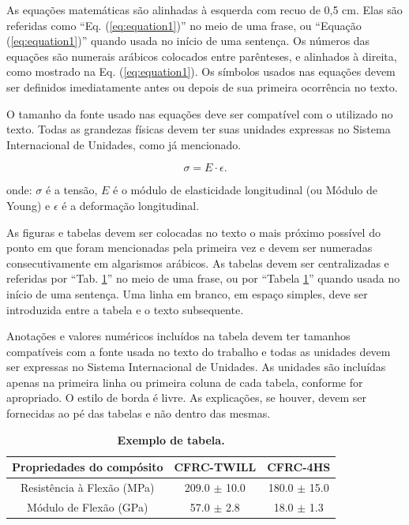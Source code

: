 \documentclass[10pt,fleqn,a4paper,twoside]{article}
\begin{document}
        As equações matemáticas são alinhadas à esquerda com recuo de 0,5 cm.  Elas são referidas como ``Eq. (\ref{eq:equation1})'' no meio de uma frase, ou ``Equação (\ref{eq:equation1})'' quando usada no início de uma sentença. Os números das equações são numerais arábicos colocados entre parênteses, e alinhados à direita, como mostrado na Eq. (\ref{eq:equation1}). Os símbolos usados nas equações devem ser definidos imediatamente antes ou depois de sua primeira ocorrência no texto.

        O tamanho da fonte usado nas equações deve ser compatível com o utilizado no texto. Todas as grandezas físicas devem ter suas unidades expressas no Sistema Internacional de Unidades, como já mencionado.

        \begin{equation}
        \sigma = E \cdot \epsilon. \label{eq:equation1}
        \end{equation}
    
    	\noindent
    	onde: $\sigma$ é a tensão, $E$ é o módulo de elasticidade longitudinal (ou Módulo de Young) e $\epsilon$ é a deformação longitudinal.

        As figuras e tabelas devem ser colocadas no texto o mais próximo possível do ponto em que foram mencionadas pela primeira vez e devem ser numeradas consecutivamente em algarismos arábicos. As tabelas devem ser centralizadas e referidas por ``Tab. \ref{tab:tabexemplo}'' no meio de uma frase, ou por ``Tabela \ref{tab:tabexemplo}'' quando usada no início de uma sentença. Uma linha em branco, em espaço simples, deve ser introduzida entre a tabela e o texto subsequente.
        
        Anotações e valores numéricos incluídos na tabela devem ter tamanhos compatíveis com a fonte usada no texto do trabalho e todas as unidades devem ser expressas no Sistema Internacional de Unidades. As unidades são incluídas apenas na primeira linha ou primeira coluna de cada tabela, conforme for apropriado. O estilo de borda é livre. As explicações, se houver, devem ser fornecidas ao pé das tabelas e não dentro das mesmas.

        \begin{table}[ht]
            \begin{center}
                \caption{\textbf{Exemplo de tabela.}}
                    \begin{tabular}{c|c|c}
                    \hline
                    Propriedades do compósito       & CFRC-TWILL        & CFRC-4HS         \\
                    \hline
                    Resistência à Flexão  (MPa)     & 209.0 $\pm$ 10.0       & 180.0 $\pm$  15.0    \\
                    \hline
                    Módulo de Flexão  (GPa)         & 57.0 $\pm$ 2.8    & 18.0 $\pm$  1.3  \\
                    \hline
                    \end{tabular} \label{tab:tabexemplo}
            \end{center}
        \end{table}
\end{document}
